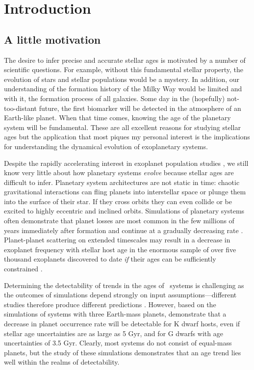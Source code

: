 \chapter{Introduction}
\label{chapter:intro}
\section{A little motivation}

The desire to infer precise and accurate stellar ages is motivated by a number
of scientific questions.
For example, without this fundamental stellar property, the evolution of stars
and stellar populations would be a mystery.
In addition, our understanding of the formation history of the Milky Way would
be limited and with it, the formation process of all galaxies.
Some day in the (hopefully) not-too-distant future, the first biomarker will
be detected in the atmosphere of an Earth-like planet.
When that time comes, knowing the age of the planetary system will be
fundamental.
These are all excellent reasons for studying stellar ages but the application
that most piques my personal interest is the implications for understanding
the dynamical evolution of exoplanetary systems.

Despite the rapidly accelerating interest in exoplanet population studies
\citep[e.g.][]{Petigura2013, Foreman-Mackey2014, Dressing2015, Burke2015}, we
still know very little about how planetary systems {\it evolve} because
stellar ages are difficult to infer.
Planetary system architectures are not static in time: chaotic gravitational
interactions can fling planets into interstellar space or plunge them into the
surface of their star.
If they cross orbits they can even collide or be excited to highly eccentric
and inclined orbits.
Simulations of planetary systems often demonstrate that planet losses are most
common in the few millions of years immediately after formation and continue
at a gradually decreasing rate \citep[e.g.][]{Zhou2007, Smith2009, Funk2010,
Pu2015}.
Planet-planet scattering on extended timescales may result in a decrease in
exoplanet frequency with stellar host age in the enormous sample of over five
thousand exoplanets discovered to date {\it if} their ages can be sufficiently
constrained \citep{Veras2015}.

Determining the detectability of trends in the ages of \Kepler\ systems is
challenging as the outcomes of simulations depend strongly on input
assumptions---different studies therefore produce different predictions
\citep[see figure 3 of][]{Pu2015}.
However, based on the \citet{Smith2009} simulations of systems with three
Earth-mass planets, \citet{Veras2015} demonstrate that a decrease in planet
occurrence rate will be detectable for K dwarf hosts, even if stellar age
uncertainties are as large as 5 Gyr, and for G dwarfs with age uncertainties of
3.5 Gyr.
Clearly, most systems do not consist of equal-mass planets, but the study
of these simulations demonstrates that an age trend lies well within the
realms of detectability.

